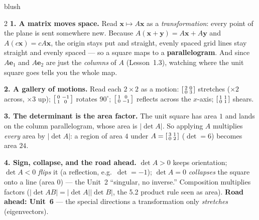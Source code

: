 \documentclass[10pt]{article}
\newcommand{\xx}{\mathbf{x}}
\newcommand{\yy}{\mathbf{y}}
\newcommand{\ee}{\mathbf{e}}
\begin{document}
\begin{skillbox}[Lesson]{blush}
\begin{multicols}{2}
\textbf{1. A matrix moves space.} Read $\xx\mapsto A\xx$ as a \emph{transformation}: every point of the
plane is sent somewhere new. Because $A(\xx+\yy)=A\xx+A\yy$ and $A(c\xx)=cA\xx$, the origin stays put
and straight, evenly spaced grid lines stay straight and evenly spaced --- so a square maps to a
\textbf{parallelogram}. And since $A\ee_1$ and $A\ee_2$ are just the \emph{columns} of $A$ (Lesson~1.3),
watching where the unit square goes tells you the whole map.

\textbf{2. A gallery of motions.} Read each $2\times2$ as a motion: $\begin{bsmallmatrix} 2 & 0\\ 0 & 3
\end{bsmallmatrix}$ stretches ($\times2$ across, $\times3$ up); $\begin{bsmallmatrix} 0 & -1\\ 1 & 0
\end{bsmallmatrix}$ rotates $90^\circ$; $\begin{bsmallmatrix} 1 & 0\\ 0 & -1 \end{bsmallmatrix}$ reflects
across the $x$-axis; $\begin{bsmallmatrix} 1 & 1\\ 0 & 1 \end{bsmallmatrix}$ shears.

\columnbreak

\textbf{3. The determinant is the area factor.} The unit square has area $1$ and lands on the column
parallelogram, whose area is $|\det A|$. So applying $A$ multiplies \emph{every} area by $|\det A|$: a
region of area $4$ under $A=\begin{bsmallmatrix} 3 & 1\\ 0 & 2 \end{bsmallmatrix}$ ($\det=6$) becomes
area $24$.

\textbf{4. Sign, collapse, and the road ahead.} $\det A>0$ keeps orientation; $\det A<0$ \emph{flips} it
(a reflection, e.g.\ $\det=-1$); $\det A=0$ \emph{collapses} the square onto a line (area $0$) --- the
Unit~2 ``singular, no inverse.'' Composition multiplies factors ($|\det AB|=|\det A||\det B|$, the 5.2
product rule seen as area). \textbf{Road ahead: Unit~6} --- the special directions a transformation only
\emph{stretches} (eigenvectors).
\end{multicols}
\end{skillbox}
\end{document}
